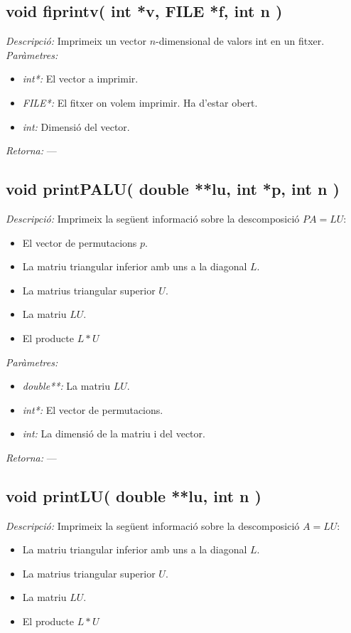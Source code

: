 \documentclass[a4paper,10pt, notitlepage]{article}
\begin{document}
\subsection{void fiprintv( int *v, FILE *f, int n )}
\textit{Descripció: }
  Imprimeix un vector $n$-dimensional de valors int en un fitxer.
\\\textit{Paràmetres: }\begin{itemize}[label={--}]
  \item \textit{int*: } El vector a imprimir.
  \item \textit{FILE*: } El fitxer on volem imprimir. Ha d'estar obert.
  \item \textit{int: } Dimensió del vector.
\end{itemize}
\textit{Retorna: } ---



\subsection{void printPALU( double **lu, int *p, int n )}
\textit{Descripció: }
  Imprimeix la següent informació sobre la descomposició $PA=LU$:
  \begin{itemize}
   \item El vector de permutacions $p$.
   \item La matriu triangular inferior amb uns a la diagonal $L$.
   \item La matrius triangular superior $U$.
   \item La matriu $LU$.
   \item El producte $L*U$
  \end{itemize}

\textit{Paràmetres: }\begin{itemize}[label={--}]
  \item \textit{double**: } La matriu $LU$.
  \item \textit{int*: } El vector de permutacions.
  \item \textit{int: } La dimensió de la matriu i del vector.
\end{itemize}
\textit{Retorna: } ---



\subsection{void printLU( double **lu, int n )}
\textit{Descripció: }
  Imprimeix la següent informació sobre la descomposició $A=LU$:
  \begin{itemize}
   \item La matriu triangular inferior amb uns a la diagonal $L$.
   \item La matrius triangular superior $U$.
   \item La matriu $LU$.
   \item El producte $L*U$
  \end{itemize}
\end{document}
